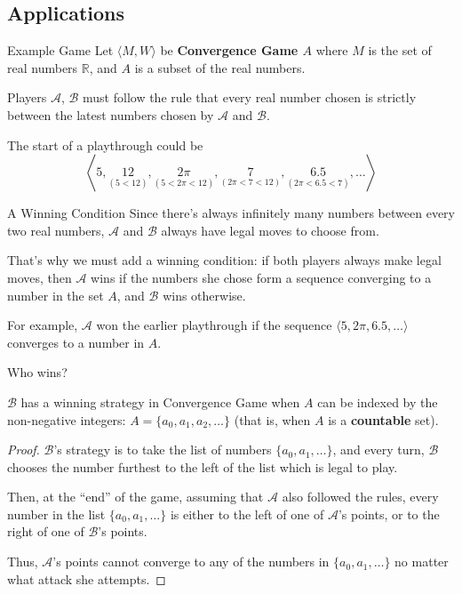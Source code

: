 \documentclass{beamer}
\theoremstyle{theorem}
\theoremstyle{definition}
\newcommand{\<}{\langle}
\renewcommand{\>}{\rangle}
\newcommand{\pl}[1]{\mathscr{#1}}
\newcommand{\vpause}{\pause\vspace{1em}}
\newcommand{\term}[1]{\textbf{#1}}
\begin{document}
\subsection{Applications}

\begin{frame}{Example Game}
  Let $\<M,W\>$ be \term{Convergence Game $A$} where $M$ is the set of real
  numbers $\mathbb{R}$, and $A$ is a subset of the real numbers.

  \vpause

  Players $\pl A$, $\pl B$ must follow the rule that every real number chosen is
  strictly between the latest numbers chosen by $\pl A$ and $\pl B$.

  \vpause

  The start of a playthrough could be
    \[
      \left\<
        5,
        \underset{(5<12)}{12},
        \underset{(5<2\pi<12)}{2\pi},
        \underset{(2\pi<7<12)}{7},
        \underset{(2\pi<6.5<7)}{6.5},
        \dots
      \right\>
    \]
\end{frame}

\begin{frame}{A Winning Condition}
  Since there's always infinitely many numbers between every
  two real numbers, $\pl A$ and $\pl B$ always have legal moves to choose from.

  \vpause

  That's why we must add a winning condition: if both players always make legal
  moves, then $\pl A$ wins if the numbers she chose form a sequence converging
  to a number in the set $A$, and $\pl B$ wins otherwise.

  \vpause

  For example, $\pl A$ won the earlier playthrough if the sequence
  $\<5,2\pi,6.5,\dots\>$ converges to a number in $A$.
\end{frame}

\begin{frame}{Who wins?}
  \begin{theorem}
    $\pl B$ has a winning strategy in Convergence Game when $A$ can be indexed
    by the non-negative integers: $A=\{a_0,a_1,a_2,\dots\}$
    (that is, when $A$ is a \term{countable} set).
  \end{theorem}
\end{frame}

\begin{frame}
  \begin{proof}
    $\pl B$'s strategy is to take the list of numbers $\{a_0,a_1,\dots\}$,
    and every turn, $\pl B$ chooses the number furthest to the left of the list
    which is legal to play.

    \vpause

    Then, at the ``end'' of the game, assuming that $\pl A$ also followed the
    rules, every number in the list $\{a_0,a_1,\dots\}$ is either to the left
    of one of $\pl A$'s points, or to the right of one of $\pl B$'s points.

    \vpause

    Thus, $\pl A$'s points cannot converge to any of the numbers in
    $\{a_0,a_1,\dots\}$ no matter what attack she attempts.
  \end{proof}
\end{frame}
\end{document}
